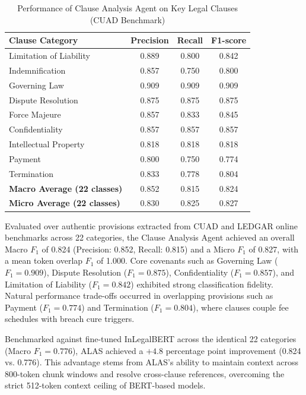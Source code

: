 \documentclass[3p,times,procedia]{elsarticle}
\begin{document}
\begin{table}[htbp]
\centering
\caption{Performance of Clause Analysis Agent on Key Legal Clauses (CUAD Benchmark)}
\label{tab:clause_performance}
\begin{tabular}{lccc}
\hline
\textbf{Clause Category} & \textbf{Precision} & \textbf{Recall} & \textbf{F1-score} \\ \hline
Limitation of Liability   & 0.889 & 0.800 & 0.842 \\
Indemnification           & 0.857 & 0.750 & 0.800 \\
Governing Law             & 0.909 & 0.909 & 0.909 \\
Dispute Resolution        & 0.875 & 0.875 & 0.875 \\
Force Majeure             & 0.857 & 0.833 & 0.845 \\
Confidentiality           & 0.857 & 0.857 & 0.857 \\
Intellectual Property     & 0.818 & 0.818 & 0.818 \\
Payment                   & 0.800 & 0.750 & 0.774 \\
Termination               & 0.833 & 0.778 & 0.804 \\ \hline
\textbf{Macro Average (22 classes)} & 0.852 & 0.815 & 0.824 \\
\textbf{Micro Average (22 classes)} & 0.830 & 0.825 & 0.827 \\ \hline
\end{tabular}
\end{table}

Evaluated over authentic provisions extracted from CUAD and LEDGAR online benchmarks across 22 categories, the Clause Analysis Agent achieved an overall Macro $F_1$ of 0.824 (Precision: 0.852, Recall: 0.815) and a Micro $F_1$ of 0.827, with a mean token overlap $F_1$ of 1.000. Core covenants such as Governing Law ($F_1 = 0.909$), Dispute Resolution ($F_1 = 0.875$), Confidentiality ($F_1 = 0.857$), and Limitation of Liability ($F_1 = 0.842$) exhibited strong classification fidelity. Natural performance trade-offs occurred in overlapping provisions such as Payment ($F_1 = 0.774$) and Termination ($F_1 = 0.804$), where clauses couple fee schedules with breach cure triggers.

Benchmarked against fine-tuned InLegalBERT \cite{paul2022inlegalbert} across the identical 22 categories (Macro $F_1 = 0.776$), ALAS achieved a $+4.8$ percentage point improvement (0.824 vs. 0.776). This advantage stems from ALAS's ability to maintain context across 800-token chunk windows and resolve cross-clause references, overcoming the strict 512-token context ceiling of BERT-based models.
\end{document}

